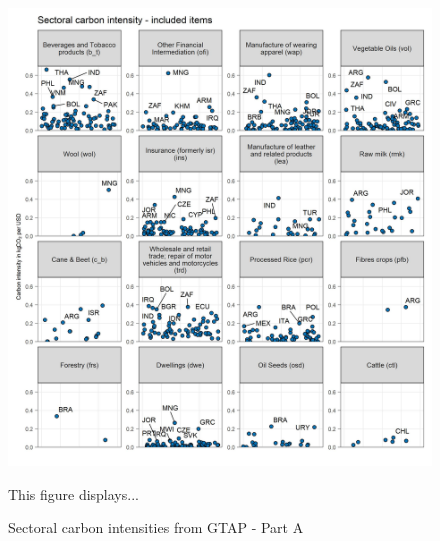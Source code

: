 \documentclass[12pt, a4paper]{article}
\newenvironment{subcaption}
{\strut
\vspace{-5pt}
\begin{minipage}[b]{0.9\textwidth}
  \hspace*{-\parindent}
  \footnotesize}
 {\end{minipage}}
\begin{document}
\begin{figure}[ht!]
  \centering
  \caption{Sectoral carbon intensities from GTAP - Part A} \label{fig:B1}
  \includegraphics{Analysis_Carbon_Intensities_GTAP/Figure_2.1.1_A}
  \begin{subcaption}
    This figure displays...
  \end{subcaption}

\end{figure}

\clearpage
\end{document}
